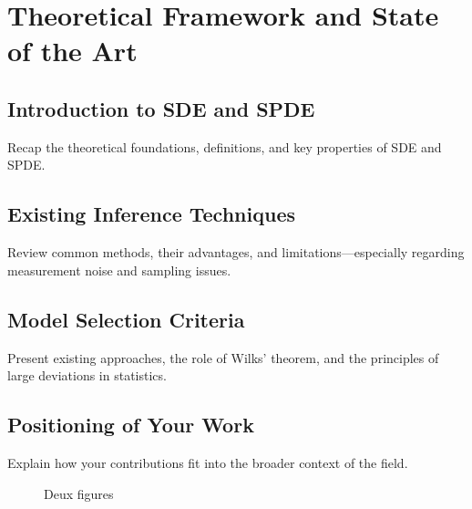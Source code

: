 \chapter{Theoretical Framework and State of the Art}
\chaptertoc{}

\section{Introduction to SDE and SPDE}
Recap the theoretical foundations, definitions, and key properties of SDE and SPDE.

\section{Existing Inference Techniques}
Review common methods, their advantages, and limitations—especially regarding measurement noise and sampling issues.

\section{Model Selection Criteria}
Present existing approaches, the role of Wilks’ theorem, and the principles of large deviations in statistics.

\section{Positioning of Your Work}
Explain how your contributions fit into the broader context of the field.


				\begin{figure}
					\centering
					\caption{Deux figures}
					\label{fig:deux_figures}
				\end{figure}

